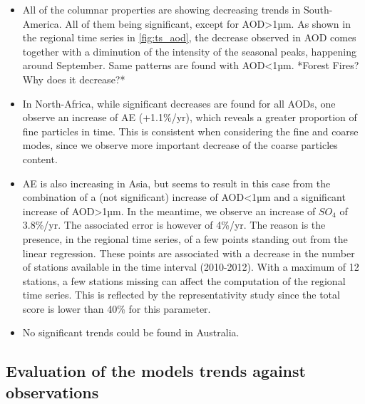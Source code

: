 \documentclass[journal abbreviation, manuscript]{copernicus}
\begin{document}
\begin{itemize}
    \item All of the columnar properties are showing decreasing trends in South-America. All of them being significant, except for AOD>1µm. As shown in the regional time series in \ref{fig:ts_aod}, the decrease observed in AOD comes together with a diminution of the intensity of the seasonal peaks, happening around September. Same patterns are found with AOD<1µm. *Forest Fires? Why does it decrease?*
    \item In North-Africa, while significant decreases are found for all AODs, one observe an increase of AE (+1.1\%/yr), which reveals a greater proportion of fine particles in time. This is consistent when considering the fine and coarse modes, since we observe more important decrease of the coarse particles content.
    \item AE is also increasing in Asia, but seems to result in this case from the combination of a (not significant) increase of AOD<1µm and a significant increase of AOD>1µm. In the meantime, we observe an increase of $SO_{4}$ of 3.8\%/yr. The associated error is however of 4\%/yr. The reason is the presence, in the regional time series, of a few points standing out from the linear regression. These points are associated with a decrease in the number of stations available in the time interval (2010-2012). With a maximum of 12 stations, a few stations missing can affect the computation of the regional time series. This is reflected by the representativity study since the total score is lower than 40\% for this parameter.
    \item No significant trends could be found in Australia.
    
\end{itemize}

\subsection{Evaluation of the models trends against observations}
\end{document}

